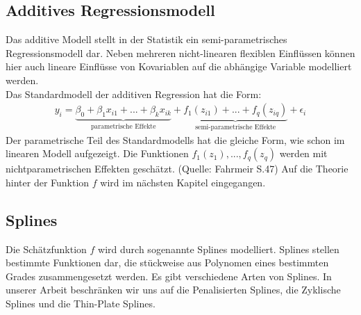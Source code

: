 \documentclass[12pt]{scrreprt}
\begin{document}
\subsection{Additives Regressionsmodell}
Das additive Modell stellt in der Statistik ein semi-parametrisches Regressionsmodell dar. Neben mehreren nicht-linearen flexiblen Einﬂüssen können hier auch lineare Einflüsse von Kovariablen auf die abhängige Variable modelliert werden. \\
Das Standardmodell der additiven Regression hat die Form:
\begin{align}
y_{i}=\underbrace{\beta_{0}+\beta_{1}x_{i1}+...+\beta_{k}x_{ik}}_{\text{parametrische Effekte}}+ \underbrace{f_{1}(z_{i1})+...+f_{q}(z_{iq})}_{\text{semi-parametrische Effekte}}+\epsilon_{i}
\end{align}
Der parametrische Teil des Standardmodells hat die gleiche Form, wie schon im linearen Modell aufgezeigt. Die Funktionen $f_{1}(z_{1}),...,f_{q}(z_{q})$ werden mit nichtparametrischen Effekten geschätzt. (Quelle: Fahrmeir S.47)
Auf die Theorie hinter der Funktion $f$ wird im nächsten Kapitel eingegangen.
\subsection{Splines}
Die Schätzfunktion $f$ wird durch sogenannte Splines modelliert. Splines stellen bestimmte Funktionen dar, die stückweise aus Polynomen eines bestimmten Grades zusammengesetzt werden. Es gibt verschiedene Arten von Splines. In unserer Arbeit beschränken wir uns auf die Penalisierten Splines, die Zyklische Splines und die Thin-Plate Splines.
\end{document}
